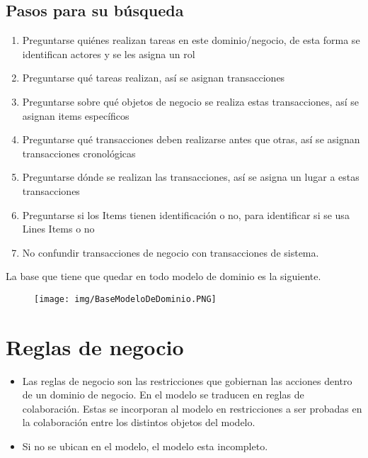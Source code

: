 \subsection*{Pasos para su búsqueda}
\begin{enumerate}
\item Preguntarse quiénes realizan tareas en este dominio/negocio, de esta forma se identifican actores y se les asigna un rol
\item Preguntarse qué tareas realizan, así se asignan transacciones
\item Preguntarse sobre qué objetos de negocio se realiza estas transacciones, así se asignan items específicos
\item Preguntarse qué transacciones deben realizarse antes que otras, así se asignan transacciones cronológicas
\item Preguntarse dónde se realizan las transacciones, así se asigna un lugar a estas transacciones
\item Preguntarse si los Items tienen identificación o no, para identificar si se usa Lines Items o no
\item No confundir transacciones de negocio con transacciones de sistema.
\end{enumerate}

La base que tiene que quedar en todo modelo de dominio es la siguiente.

\begin{figure}[!htb]
    \centering
    \texttt{[image: img/BaseModeloDeDominio.PNG]}
\end{figure}

\section{Reglas de negocio}

\begin{itemize}
\item Las reglas de negocio son las restricciones que gobiernan las acciones dentro de un dominio de negocio. En el modelo se traducen en reglas de colaboración. Estas se incorporan al modelo en restricciones a ser probadas en la colaboración entre los distintos objetos del modelo.
\item Si no se ubican en el modelo, el modelo esta incompleto.
\end{itemize}

